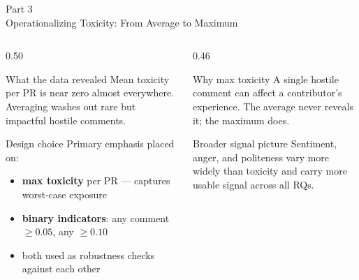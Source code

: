\documentclass[aspectratio=169,11pt]{beamer}
\begin{document}
\begin{frame}{Part 3\\Operationalizing Toxicity: From Average to Maximum}

\begin{columns}[T]
\begin{column}{0.50\textwidth}
\begin{alertblock}{What the data revealed}
Mean toxicity per PR is near zero almost everywhere.
Averaging washes out rare but impactful hostile comments.
\end{alertblock}

\begin{exampleblock}{Design choice}
Primary emphasis placed on:
\begin{itemize}
  \item \textbf{max toxicity} per PR — captures worst-case exposure
  \item \textbf{binary indicators}: any comment $\geq 0.05$, any $\geq 0.10$
  \item both used as robustness checks against each other
\end{itemize}
\end{exampleblock}
\end{column}

\begin{column}{0.46\textwidth}
\begin{block}{Why max toxicity}
A single hostile comment can affect a contributor's experience.
The average never reveals it; the maximum does.
\end{block}

\vspace{0.3em}
\begin{block}{Broader signal picture}
Sentiment, anger, and politeness vary more widely than toxicity
and carry more usable signal across all RQs.
\end{block}
\end{column}
\end{columns}

\end{frame}
\end{document}
